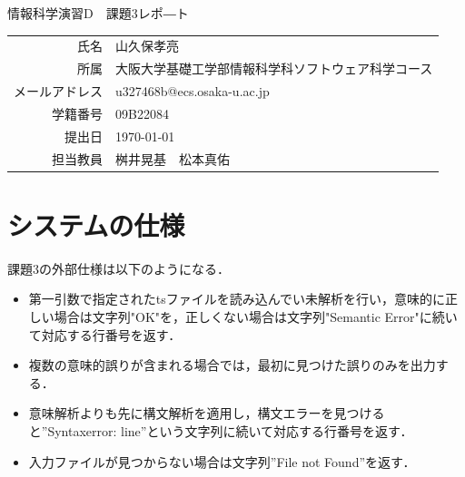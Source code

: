 \documentclass[dvipdfmx]{jarticle}
\begin{document}
\begin{titlepage}
    \begin{center}
        {\huge 情報科学演習D　課題3レポ―ト}
        \vspace{180pt}\\
        \begin{tabular}{rl}
            氏名 & 山久保孝亮\\
            所属 & 大阪大学基礎工学部情報科学科ソフトウェア科学コース\\
            メールアドレス & u327468b@ecs.osaka-u.ac.jp\\
            学籍番号 & 09B22084\\
            提出日 & \today\\
            担当教員 & 桝井晃基　松本真佑
        \end{tabular}
    \end{center}
\end{titlepage}
\section{システムの仕様}
課題3の外部仕様は以下のようになる．
\begin{itemize}
  \item 第一引数で指定されたtsファイルを読み込んでい未解析を行い，意味的に正しい場合は文字列"OK"を，正しくない場合は文字列"Semantic Error"に続いて対応する行番号を返す．
  \item 複数の意味的誤りが含まれる場合では，最初に見つけた誤りのみを出力する．
  \item 意味解析よりも先に構文解析を適用し，構文エラーを見つけると”Syntaxerror: line”という文字列に続いて対応する行番号を返す．
  \item 入力ファイルが見つからない場合は文字列”File not Found”を返す．
\end{itemize}
\end{document}
